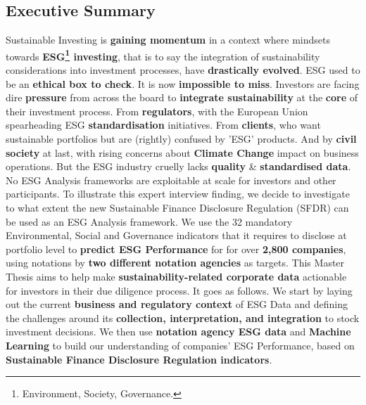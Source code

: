 \documentclass[12pt]{report}
\begin{document}
\begin{titlepage}
\section*{Executive Summary}
Sustainable Investing is \textbf{gaining momentum} in a context where mindsets towards \textbf{ESG\footnote{Environment, Society, Governance.} investing}, that is to say the integration of sustainability considerations into investment processes, have \textbf{drastically evolved}.\newline \newline
ESG used to be an \textbf{ethical box to check}. It is now \textbf{impossible to miss}. Investors are facing dire \textbf{pressure} from across the board to \textbf{integrate sustainability} at the \textbf{core} of their investment process. From \textbf{regulators}, with the European Union spearheading ESG \textbf{standardisation} initiatives. From \textbf{clients}, who want sustainable portfolios but are (rightly) confused by 'ESG' products. And by \textbf{civil society} at last, with rising concerns about \textbf{Climate Change} impact on business operations.\newline
But the ESG industry cruelly lacks \textbf{quality} \& \textbf{standardised data}. No ESG Analysis frameworks are exploitable at scale for investors and other participants. To illustrate this expert interview finding, we decide to investigate to what extent the new Sustainable Finance Disclosure Regulation (SFDR) can be used as an ESG Analysis framework. We use the 32 mandatory Environmental, Social and Governance indicators that it requires to disclose at portfolio level to \textbf{predict ESG Performance} for for over \textbf{2,800 companies}, using notations by \textbf{two different notation agencies} as targets.\newline
This Master Thesis aims to help make \textbf{sustainability-related corporate data} actionable for investors in their due diligence process. It goes as follows. We start by laying out the current \textbf{business and regulatory context} of ESG Data and defining the challenges around its \textbf{collection, interpretation, and integration} to stock investment decisions. We then use \textbf{notation agency ESG data} and \textbf{Machine Learning} to build our understanding of companies' ESG Performance, based on \textbf{Sustainable Finance Disclosure Regulation indicators}.
\end{titlepage}

\begin{titlepage}
\tableofcontents
\end{titlepage}
\end{document}
